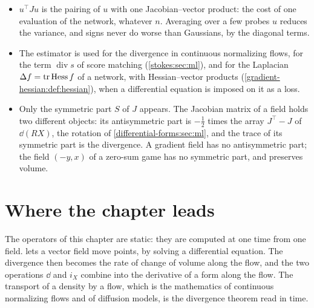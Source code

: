 \begin{notechapter}
\begin{mlthread}
\begin{itemize}[nosep]
  \item $u^\top Ju$ is the pairing of $u$ with one Jacobian--vector
        product: the cost of one evaluation of the network, whatever
        $n$. Averaging over a few probes $u$ reduces the variance, and
        signs never do worse than Gaussians, by the diagonal terms.
  \item The estimator is used for the divergence in continuous
        normalizing flows, for the term $\operatorname{div}s$ of score
        matching (\cref{stokes:sec:ml}), and for the Laplacian
        $\Delta f = \operatorname{tr}\operatorname{Hess}f$ of a network, with
        Hessian--vector products
        (\cref{gradient-hessian:def:hessian}), when a differential
        equation is imposed on it as a loss.
  \item Only the symmetric part $S$ of $J$ appears. The Jacobian
        matrix of a field holds two different objects: its
        antisymmetric part is $-\frac12$ times the array $J^\top - J$
        of $\dd(RX)$, the rotation of
        \cref{differential-forms:sec:ml}, and the trace of its
        symmetric part is the divergence. A gradient field has no
        antisymmetric part; the field $(-y, x)$ of a zero-sum game has
        no symmetric part, and preserves volume.
\end{itemize}
\end{mlthread}

\section{Where the chapter leads}\label{vector-calculus:sec:outlook}

The operators of this chapter are static: they are computed at one
time from one field.  lets a vector field move
points, by solving a differential equation. The divergence then
becomes the rate of change of volume along the flow, and the two
operations $\dd$ and $i_X$ combine into the derivative of a form along
the flow. The transport of a density by a flow, which is the
mathematics of continuous normalizing flows and of diffusion models,
is the divergence theorem read in time.


\end{notechapter}
